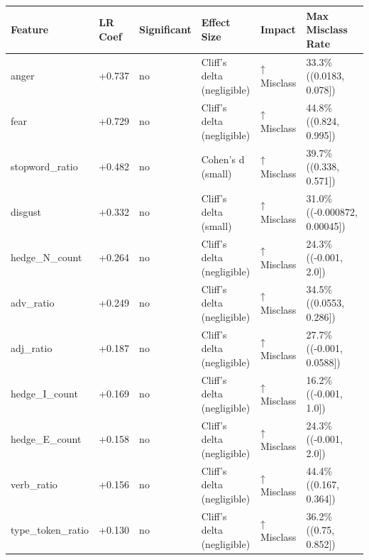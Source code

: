 \begin{tabular}{llllll}
\toprule
Feature & LR Coef & Significant & Effect Size & Impact & Max Misclass Rate \\
\midrule
anger & +0.737 & no & Cliff's delta (negligible) & ↑ Misclass & 33.3\% ((0.0183, 0.078]) \\
fear & +0.729 & no & Cliff's delta (negligible) & ↑ Misclass & 44.8\% ((0.824, 0.995]) \\
stopword\_ratio & +0.482 & no & Cohen's d (small) & ↑ Misclass & 39.7\% ((0.338, 0.571]) \\
disgust & +0.332 & no & Cliff's delta (small) & ↑ Misclass & 31.0\% ((-0.000872, 0.00045]) \\
hedge\_N\_count & +0.264 & no & Cliff's delta (negligible) & ↑ Misclass & 24.3\% ((-0.001, 2.0]) \\
adv\_ratio & +0.249 & no & Cliff's delta (negligible) & ↑ Misclass & 34.5\% ((0.0553, 0.286]) \\
adj\_ratio & +0.187 & no & Cliff's delta (negligible) & ↑ Misclass & 27.7\% ((-0.001, 0.0588]) \\
hedge\_I\_count & +0.169 & no & Cliff's delta (negligible) & ↑ Misclass & 16.2\% ((-0.001, 1.0]) \\
hedge\_E\_count & +0.158 & no & Cliff's delta (negligible) & ↑ Misclass & 24.3\% ((-0.001, 2.0]) \\
verb\_ratio & +0.156 & no & Cliff's delta (negligible) & ↑ Misclass & 44.4\% ((0.167, 0.364]) \\
type\_token\_ratio & +0.130 & no & Cliff's delta (negligible) & ↑ Misclass & 36.2\% ((0.75, 0.852]) \\
\bottomrule
\end{tabular}
